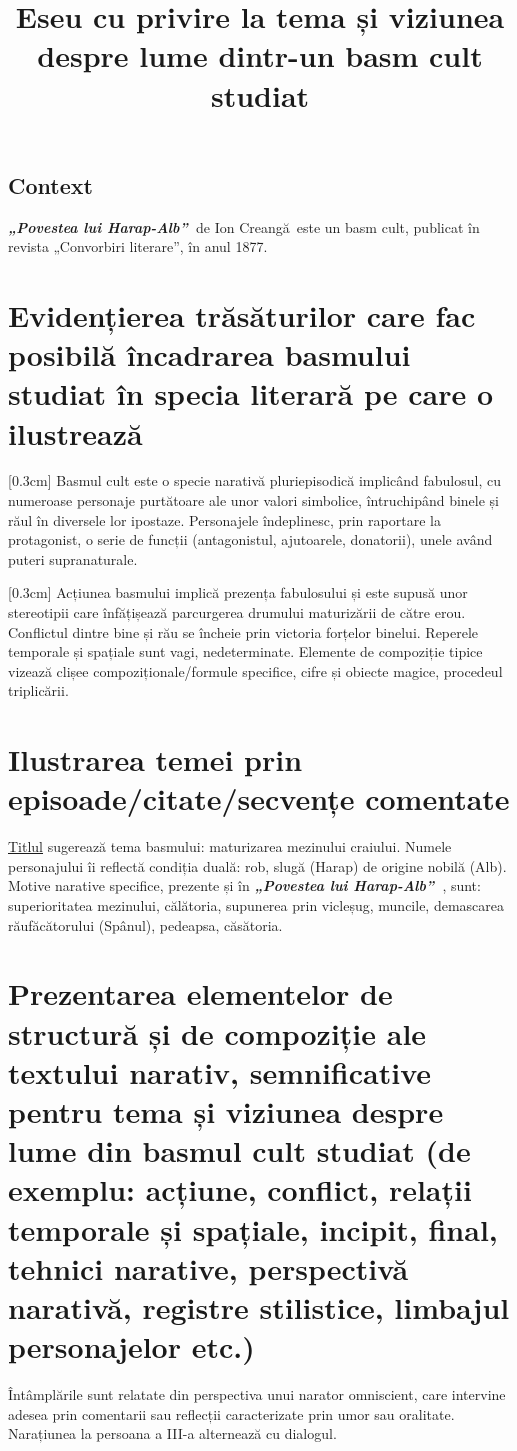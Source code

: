 \documentclass[
12pt,
a4paper
]{article}
\title{Eseu cu privire la tema și viziunea despre lume dintr-un basm cult studiat}
\date{}   %
\author{} %
\newcommand{\operatitle}{\textbf{\textit{„Povestea lui Harap-Alb”\ }}} %
\newcommand{\operaauthor}{Ion Creangă\ }                               %
\begin{document}
\maketitle %



\subsection{Context}

\operatitle de \operaauthor este un basm cult, publicat în revista „Convorbiri literare”, în anul 1877.

\section{Evidențierea trăsăturilor care fac posibilă încadrarea basmului studiat în specia literară pe care o ilustrează}
[0.3cm]
Basmul cult este o specie narativă pluriepisodică implicând fabulosul, cu numeroase personaje purtătoare ale unor valori simbolice, întruchipând binele și răul în diversele lor ipostaze. Personajele îndeplinesc, prin raportare la protagonist, o serie de funcții (antagonistul, ajutoarele, donatorii), unele având puteri supranaturale.

[0.3cm]
Acțiunea basmului implică prezența fabulosului și este supusă unor stereotipii care înfățișează parcurgerea drumului maturizării de către erou. Conflictul dintre bine și rău se încheie prin victoria forțelor binelui. Reperele temporale și spațiale sunt vagi, nedeterminate. Elemente de compoziție tipice vizează clișee compoziționale/formule specifice, cifre și obiecte magice, procedeul triplicării.

\section{Ilustrarea temei prin episoade/citate/secvențe comentate}
\underline{Titlul} sugerează tema basmului: maturizarea mezinului craiului. Numele personajului îi reflectă condiția duală: rob, slugă (Harap) de origine nobilă (Alb). Motive narative specifice, prezente și în \operatitle, sunt: superioritatea mezinului, călătoria, supunerea prin vicleșug, muncile, demascarea răufăcătorului (Spânul), pedeapsa, căsătoria.

\section{Prezentarea elementelor de structură și de compoziție ale textului narativ, semnificative pentru tema și viziunea despre lume din basmul cult studiat {\footnotesize (de exemplu: acțiune, conflict, relații temporale și spațiale, incipit, final, tehnici narative, perspectivă narativă, registre stilistice, limbajul personajelor etc.)}}
Întâmplările sunt relatate din perspectiva unui narator omniscient, care intervine adesea prin comentarii sau reflecții caracterizate prin umor sau oralitate. Narațiunea la persoana a III-a alternează cu dialogul.
\end{document}

